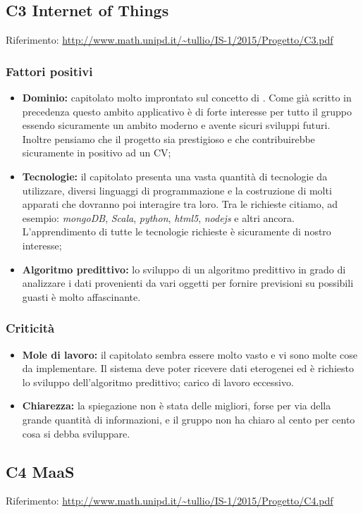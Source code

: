 \documentclass{scalatekids-article}
\begin{document}
\subsection{C3 Internet of Things}
Riferimento: \url{http://www.math.unipd.it/~tullio/IS-1/2015/Progetto/C3.pdf}\\
\subsubsection{Fattori positivi}
\begin{itemize}
\item \textbf{Dominio:} capitolato molto improntato sul concetto di . 
Come già scritto in precedenza questo ambito applicativo è di forte interesse per tutto il gruppo essendo sicuramente un ambito moderno e avente sicuri sviluppi futuri. Inoltre pensiamo che il progetto sia prestigioso e che contribuirebbe sicuramente in positivo ad un CV;
\item \textbf{Tecnologie:} il capitolato presenta una vasta quantità di tecnologie da utilizzare, diversi linguaggi di programmazione e la costruzione di molti apparati che dovranno poi interagire tra loro.
Tra le richieste citiamo, ad esempio: \textit{mongoDB}, \textit{Scala}, \textit{python}, \textit{html5}, \textit{nodejs} e altri ancora. L'apprendimento di tutte le tecnologie richieste è sicuramente di nostro interesse;
\item \textbf{Algoritmo predittivo:} lo sviluppo di un algoritmo predittivo in grado di analizzare i dati provenienti da vari oggetti per fornire previsioni su possibili guasti è molto affascinante.
\end{itemize}
\subsubsection{Criticità}
\begin{itemize}
\item \textbf{Mole di lavoro:} il capitolato sembra essere molto vasto e vi sono molte cose da implementare.
Il sistema deve poter ricevere dati eterogenei ed è richiesto lo sviluppo dell'algoritmo predittivo; carico di lavoro eccessivo.
\item \textbf{Chiarezza:} la spiegazione non è stata delle migliori, forse per via della grande quantità di informazioni, e il gruppo non ha chiaro al cento per cento cosa si debba sviluppare.
\end{itemize}

\subsection{C4 MaaS}
Riferimento: \url{http://www.math.unipd.it/~tullio/IS-1/2015/Progetto/C4.pdf}\\
\end{document}
